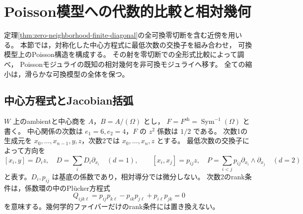 \section{Poisson模型への代数的比較と相対幾何}
\label{sec:poisson-shadow-comparison}

定理\ref{thm:zero-neighborhood-finite-diagonal}の全可換零切断を含む近傍を用いる。
本節では，対称化した中心方程式に最低次数の交換子を組み合わせ，
可換模型上のPoisson構造を構成する。
その射を零切断での全形式比較によって調べ，
Poissonモジュライの既知の相対幾何を非可換モジュライへ移す。
全ての縮小は，滑らかな可換模型の全体を保つ。

\subsection{中心方程式とJacobian括弧}

$W$ 上のambientと中心商を $A$，$B=A/(\Omega)$ とし，
$F=F^{\mathrm{sh}}=\operatorname{Sym}^{-1}(\Omega)$ と書く。
中心関係の次数は $e_1=6,e_2=4$，$F$ の $z^2$ 係数は $1/2$ である。
次数1の生成元を $x_0,\ldots,x_{n-1},y,z$，次数2では
$x_0,\ldots,x_n,z$ とする。
最低次数の交換子によって方向を
\[
 [x_i,y]=D_i z,\quad D=\sum_iD_i\partial_{x_i}\quad(d=1),
 \qquad
 [x_i,x_j]=p_{ij}z,\quad
 P=\sum_{i<j}p_{ij}\partial_{x_i}\wedge\partial_{x_j}\quad(d=2)
\]
と表す。$D_i,p_{ij}$ は基底の係数であり，相対導分では微分しない。
次数2のrank条件は，係数環の中のPl\"ucker方程式
\[
 Q_{ijk\ell}=p_{ij}p_{k\ell}-p_{ik}p_{j\ell}
                         +p_{i\ell}p_{jk}=0
\]
を意味する。幾何学的ファイバーだけのrank条件には置き換えない。

